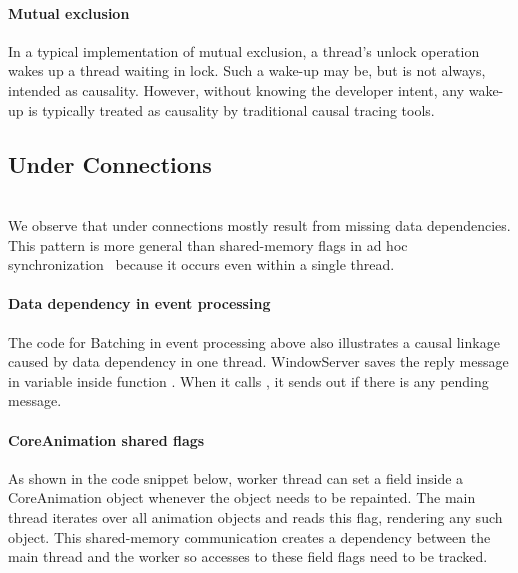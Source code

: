 \paragraph{Mutual exclusion}

In a typical implementation of mutual exclusion, a thread's unlock
operation wakes up a thread waiting in lock.  Such a wake-up may be, but
is not always, intended as causality.  However, without knowing the
developer intent, any wake-up is typically treated as causality by
traditional causal tracing tools.

\subsection{Under Connections}\hfill\\

We observe that under connections mostly result from missing data
dependencies.  This pattern is more general than shared-memory flags in ad
hoc synchronization~\cite{xiong2010ad} because it occurs even within a
single thread.

\paragraph{Data dependency in event processing}
The code for Batching in event processing above also illustrates a causal
linkage caused by data dependency in one thread. WindowServer saves the
reply message in variable  inside function
.  When it calls , it
sends out  if there is any pending message.

\paragraph{CoreAnimation shared flags}
As shown in the code snippet below, worker thread can set
a field  inside a CoreAnimation
object whenever the object needs to be repainted. The main thread iterates over
all animation objects and reads this flag, rendering any such object. This
shared-memory communication creates a dependency between the main thread and the
worker so accesses to these field flags need to be tracked.

